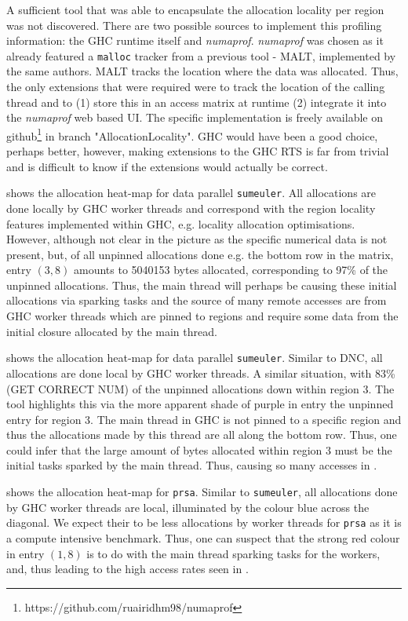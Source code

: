 \documentclass{paper}\usepackage{graphicx}
\begin{document}
A sufficient tool that was able to encapsulate the allocation locality per region was not discovered. There are two possible sources to implement this profiling information: the GHC runtime itself and \textit{numaprof}. \textit{numaprof} was chosen as it already featured a \lstinline{malloc} tracker from a previous tool - MALT\cite{DBLP:conf/oopsla/ValatCJ17}, implemented by the same authors. MALT tracks the location where the data was allocated. Thus, the only extensions that were required were to track the location of the calling thread and to (1) store this in an access matrix at runtime (2) integrate it into the \textit{numaprof} web based UI. The specific implementation is freely available on github\footnote{https://github.com/ruairidhm98/numaprof} in branch "AllocationLocality". GHC would have been a good choice, perhaps better, however, making extensions to the GHC RTS is far from trivial and is difficult to know if the extensions would actually be correct.

 shows the allocation heat-map for data parallel \lstinline{sumeuler}. All allocations are done locally by GHC worker threads and correspond with the region locality features implemented within GHC, e.g. locality allocation optimisations. However, although not clear in the picture as the specific numerical data is not present, but, of all unpinned allocations done e.g. the bottom row in the matrix, entry $(3, 8)$ amounts to 5040153 bytes allocated, corresponding to 97\% of the unpinned allocations. Thus, the main thread will perhaps be causing these initial allocations via sparking tasks and the source of many remote accesses are from GHC worker threads which are pinned to regions and require some data from the initial closure allocated by the main thread.

 shows the allocation heat-map for data parallel \lstinline{sumeuler}. Similar to DNC, all allocations are done local by GHC worker threads. A similar situation, with 83\% (GET CORRECT NUM) of the unpinned allocations down within region 3. The tool highlights this via the more apparent shade of purple in entry the unpinned entry for region 3. The main thread in GHC is not pinned to a specific region and thus the allocations made by this thread are all along the bottom row. Thus, one could infer that the large amount of bytes allocated within region 3 must be the initial tasks sparked by the main thread. Thus, causing so many accesses in .

 shows the allocation heat-map for \lstinline{prsa}. Similar to \lstinline{sumeuler}, all allocations done by GHC worker threads are local, illuminated by the colour blue across the diagonal. We expect their to be less allocations by worker threads for \lstinline{prsa} as it is a compute intensive benchmark. Thus, one can suspect that the strong red colour in entry $(1, 8)$ is to do with the main thread sparking tasks for the workers, and, thus leading to the high access rates seen in .
\end{document}
